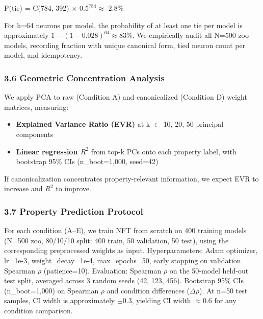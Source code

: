 P(tie) = C(784, 392) $\times$ 0.$5^{784} \approx$ 2.8\%

For h=64 neurons per model, the probability of at least one tie per model is approximately $1 - (1 - 0.028)^{64} \approx 83\%$. We empirically audit all N=500 zoo models, recording fraction with unique canonical form, tied neuron count per model, and idempotency.

\subsubsection{3.6 Geometric Concentration Analysis}

We apply PCA to raw (Condition A) and canonicalized (Condition D) weight matrices, measuring:

\begin{itemize}
\item \textbf{Explained Variance Ratio (EVR)} at k $\in$ {10, 20, 50} principal components
\item \textbf{Linear regression $R^2$} from top-k PCs onto each property label, with bootstrap 95\% CIs (n\_boot=1,000, seed=42)
\end{itemize}

If canonicalization concentrates property-relevant information, we expect EVR to increase and $R^2$ to improve.

\subsubsection{3.7 Property Prediction Protocol}

For each condition (A--E), we train NFT from scratch on 400 training models (N=500 zoo, 80/10/10 split: 400 train, 50 validation, 50 test), using the corresponding preprocessed weights as input. Hyperparameters: Adam optimizer, lr=1e-3, weight\_decay=1e-4, max\_epochs=50, early stopping on validation Spearman $\rho$ (patience=10). Evaluation: Spearman $\rho$ on the 50-model held-out test split, averaged across 3 random seeds (42, 123, 456). Bootstrap 95\% CIs (n\_boot=1,000) on Spearman $\rho$ and condition differences ($\Delta\rho$). At n=50 test samples, CI width is approximately $\pm 0.3$, yielding CI width $\approx 0.6$ for any condition comparison.

